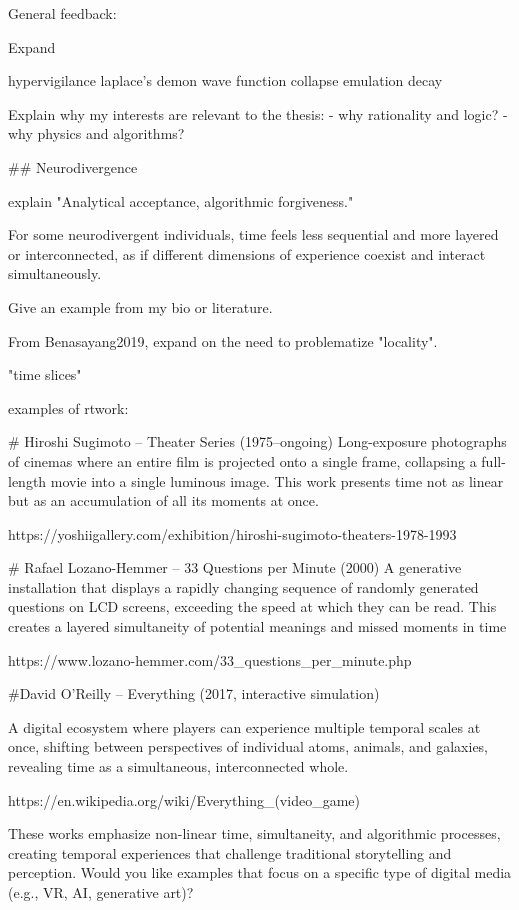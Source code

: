 

General feedback: 

Expand 

hypervigilance
laplace's demon
wave function collapse
emulation
decay

Explain why my interests are relevant to the thesis:  
 - why rationality and logic?
 - why physics and algorithms? 





## Neurodivergence

explain  "Analytical acceptance, algorithmic forgiveness." 


For some neurodivergent individuals, time feels less
sequential and more layered or interconnected, as if different
dimensions of experience coexist and interact simultaneously.

Give an example from my bio or literature. 

From Benasayang2019, expand on the need to problematize "locality". 


"time slices"

examples of rtwork: 

# Hiroshi Sugimoto – Theater Series (1975–ongoing)
Long-exposure photographs of cinemas where an entire film is projected onto a single frame, collapsing a full-length movie into a single luminous image. This work presents time not as linear but as an accumulation of all its moments at once.

https://yoshiigallery.com/exhibition/hiroshi-sugimoto-theaters-1978-1993


# Rafael Lozano-Hemmer – 33 Questions per Minute (2000)
A generative installation that displays a rapidly changing sequence of randomly generated questions on LCD screens, exceeding the speed at which they can be read. This creates a layered simultaneity of potential meanings and missed moments in time

https://www.lozano-hemmer.com/33_questions_per_minute.php



#David O’Reilly – Everything (2017, interactive simulation)

A digital ecosystem where players can experience multiple temporal scales at once, shifting between perspectives of individual atoms, animals, and galaxies, revealing time as a simultaneous, interconnected whole.

https://en.wikipedia.org/wiki/Everything_(video_game)

These works emphasize non-linear time, simultaneity, and algorithmic processes, creating temporal experiences that challenge traditional storytelling and perception. Would you like examples that focus on a specific type of digital media (e.g., VR, AI, generative art)?


